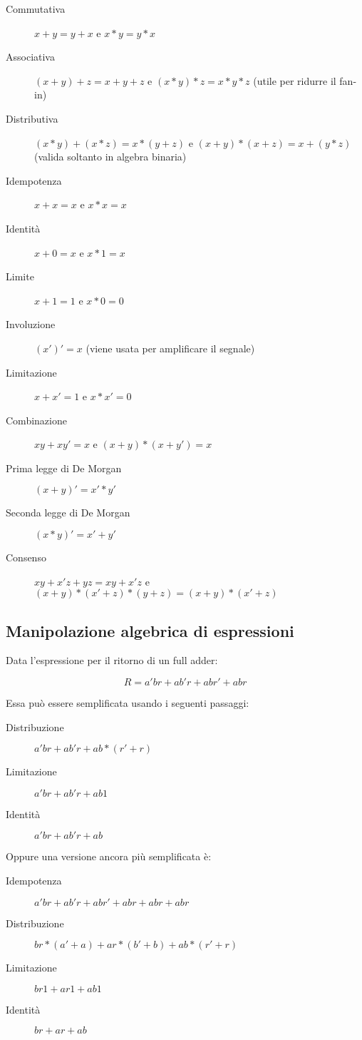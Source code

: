 \documentclass{article}
\begin{document}
\begin{description}
    \item[Commutativa] $x+y = y+x$ e $x*y = y*x$
    \item[Associativa] $(x+y)+z = x+y+z$ e $(x*y)*z = x*y*z$ (utile per ridurre il fan-in)
    \item[Distributiva] $(x*y) + (x*z) = x*(y+z)$ e $(x+y) * (x+z) = x+(y*z)$ (valida soltanto in algebra binaria)
    \item[Idempotenza] $x+x = x$ e $x*x = x$
    \item[Identità] $x+0 = x$ e $x*1 = x$
    \item[Limite] $x+1 = 1$ e $x*0 = 0$
    \item[Involuzione] $(x')' = x$ (viene usata per amplificare il segnale)
    \item[Limitazione] $x+x' = 1$ e $x * x' = 0$
    \item[Combinazione] $xy + xy' = x$ e $(x+y) * (x+y') = x$
    \item[Prima legge di De Morgan] $(x+y)' = x'*y'$
    \item[Seconda legge di De Morgan] $(x*y)' = x'+y'$
    \item[Consenso] $xy+x'z+yz = xy+x'z$ e $(x+y)*(x'+z)*(y+z) = (x+y)*(x'+z)$
\end{description}

\subsection{Manipolazione algebrica di espressioni}

Data l'espressione per il ritorno di un full adder:

$$
R = a'br + ab'r + abr' + abr
$$

\noindent
Essa può essere semplificata usando i seguenti passaggi:

\begin{description}
    \item[Distribuzione] $a'br + ab'r + ab*(r'+r)$
    \item[Limitazione] $a'br + ab'r + ab1$
    \item[Identità] $a'br + ab'r + ab$
\end{description}

\noindent
Oppure una versione ancora più semplificata è:

\begin{description}
    \item[Idempotenza] $a'br + ab'r + abr' + abr + abr + abr$
    \item[Distribuzione] $br*(a'+a) + ar*(b'+b) + ab*(r'+r)$
    \item[Limitazione] $br1 + ar1 + ab1$
    \item[Identità] $br + ar + ab$
\end{description}
\end{document}
